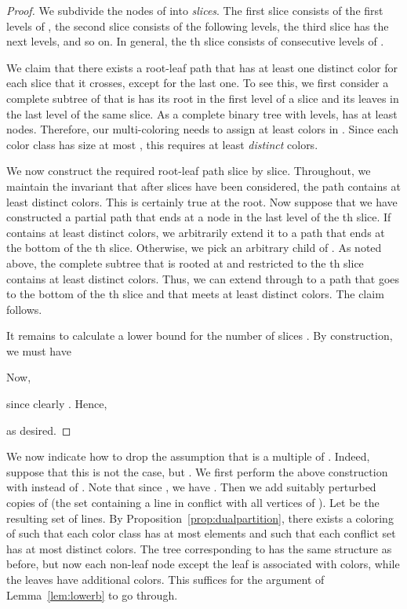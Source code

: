 \documentclass{paper}
\begin{document}
\begin{proof}
We subdivide the nodes of  into \emph{slices}. 
The first slice consists of the first  
levels of , 
the second slice consists of the following  
levels, the third slice has the next  levels,
and so on. In general, the th slice consists of 
 consecutive levels of . 

We claim that there
exists a root-leaf path that has at least one distinct color 
for each slice that it crosses, except for the last one. 
To see this, we first consider a complete subtree  of  that is
has its root in the first level of a slice  and its
leaves in the last level of the same slice. As a complete
binary tree with  levels,  has at least  
 nodes. Therefore, our 
multi-coloring needs to assign at least  colors
in . Since each color class has size at most
, this requires at least
 \emph{distinct} colors.

We now construct the required root-leaf path slice by slice.
Throughout, we maintain the invariant that after
 slices have been considered, the path contains at least
 distinct colors. This is certainly true at the root.
Now suppose that we have constructed a partial path  that  
ends at a node  in the last level of the th slice. If 
contains at least  distinct colors, we arbitrarily extend it
to a path  that ends at the bottom of the th slice.
Otherwise, we pick an arbitrary child  of . 
As noted above, the complete subtree that is rooted at  and restricted
to the th slice contains at least  distinct colors. Thus,
we can extend  through  to a path  that goes to
the bottom of the th slice and that meets at least  distinct colors.
The claim follows. 

It remains to calculate a lower bound for the number of slices .
By construction, we must have

Now,

since clearly .
Hence, 

as desired.
\end{proof}

We now indicate how to drop the assumption that  is a multiple
of . Indeed, suppose that this is not the case,
but .  We first perform the
above construction with  
instead of . Note that since , we have . 
Then we add  suitably perturbed copies of  
(the set containing a line in conflict with all vertices of ).
Let  be the resulting set of lines. By Proposition~\ref{prop:dualpartition},
there exists a coloring of  such that each color class has at most
 elements and such that each conflict set has at most
 distinct colors. The tree  corresponding to 
has the same structure as before, but now each non-leaf node except
the leaf is associated with  colors, while the leaves
have  additional colors. 
This suffices for the argument of Lemma~\ref{lem:lowerb} to go through.
\end{document}
